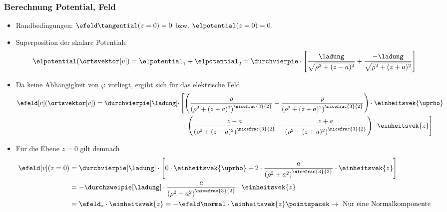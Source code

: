   \begin{frame}
    \frametitle{Berechnung Potential, Feld}

    \begin{itemize}[<+->]
\item  Randbedingungen: \(\efeld\tangential(z=0) = 0\) bzw. \(\elpotential(z=0) = 0\). 

\item Superposition der skalare Potentiale
  \begin{equation*}
	\elpotential(\ortsvektor[v]) = \elpotential_1 + \elpotential_2
		= \durchvierpie \cdot \left[ \dfrac{\ladung}{\sqrt{\rho^2 + (z - a)^2}} + \dfrac{-\ladung}{\sqrt{\rho^2 + (z + a)^2}} \right]
\end{equation*}
\item Da keine Abhängigkeit von \(\varphi\) vorliegt, ergibt sich für das elektrische Feld
\begin{equation*}
	\begin{split}
		\efeld[v](\ortsvektor[v]) = \durchvierpie[\ladung] \cdot
                &\left[ \left( \dfrac{\rho}{\left( \rho^2 + (z - a)^2 \right)^{\nicefrac{3}{2}}} - \dfrac{\rho}{\left( \rho^2 + (z + a)^2 \right)^{\nicefrac{3}{2}}} \right) \cdot \einheitsvek{\uprho} \right. \\
		&	 \left. + \left( \dfrac{z - a}{\left( \rho^2 + (z - a)^2 \right)^{\nicefrac{3}{2}}} - \dfrac{z + a}{\left( \rho^2 + (z + a)^2 \right)^{\nicefrac{3}{2}}} \right) \cdot \einheitsvek{z} \right]
	\end{split}
\end{equation*}
\item Für die Ebene \(z = 0\) gilt demnach
\begin{align*}
	\efeld[v](z=0) &= \durchvierpie[\ladung] \cdot \left[ 0 \cdot \einheitsvek{\uprho} - 2 \cdot \dfrac{a}{\left( \rho^2 + a^2 \right)^{\nicefrac{3}{2}}} \cdot \einheitsvek{z} \right] \\
		&= -\durchzweipie[\ladung] \cdot \dfrac{a}{\left( \rho^2 + a^2 \right)^{\nicefrac{3}{2}}} \cdot \einheitsvek{z} \\
		&= \efeld_z \cdot \einheitsvek{z} = -\efeld\normal \cdot \einheitsvek{z} \pointspacek \to \text{ Nur eine Normalkomponente}
\end{align*}
\end{itemize}
\end{frame}

